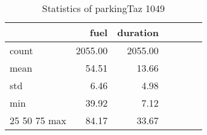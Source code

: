 \begin{table}[htbp]
\centering
\caption{Statistics of parkingTaz 1049}
\label{tab:statistics}
\begin{tabular}{lrrrrrr}
\toprule
{} &    fuel &  duration \\
\midrule
count & 2055.00 &   2055.00 \\
mean  &   54.51 &     13.66 \\
std   &    6.46 &      4.98 \\
min   &   39.92 &      7.12 \\
25%
50%
75%
max   &   84.17 &     33.67 \\
\bottomrule
\end{tabular}
\end{table}
